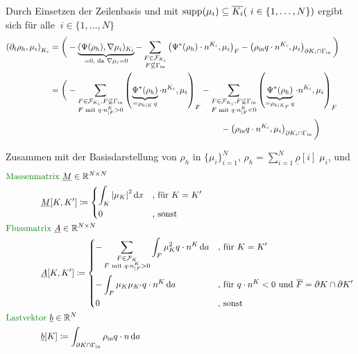 Durch Einsetzen der Zeilenbasis und mit $ \operatorname{supp}(\mu_i) \subseteq \overline{K_i} (\ i \in \{1, \dots , N\})$ ergibt sich für alle $\ i \in \{1, \dots , N\}$ 
\begin{align*}
	\left(\partial_t \rho_h, \mu_i  \right)_{K_i}  &= \bigg( -\underbrace{(\Psi(\rho_h), \nabla\mu_i)_{K_i}}_{=0 \text{, da } \nabla \mu_i = 0} - \sum_{\substack{F \in \mathcal{F}_{K_i} \\ F \not\subseteq \Gamma_{{\text{in}}}}} \left(\Psi^*(\rho_h) \cdot n^{K_i}, \mu_i \right)_{F} - \left(\rho_{\text{in}} q \cdot n^{K_i}, \mu_i \right)_{\partial K_i \cap \Gamma_{{\text{in}}}} \bigg) \\
	&= \bigg( - \sum_{\substack{F \in \mathcal{F}_{K_i}, F \not\subseteq \Gamma_{{\text{in}}}\\ F \text{ mit }q \cdot n^K_{|F} > 0} } \left(\underbrace{\Psi^*(\rho_h)}_{= \rho_{h|K}\, q} \cdot n^{K_i}, \mu_i \right)_{F} - \sum_{\substack{F \in \mathcal{F}_{K_i}, F \not\subseteq \Gamma_{{\text{in}}}\\ F \text{ mit }q \cdot n^K_{|F} < 0} } \left(\underbrace{\Psi^*(\rho_h)}_{= \rho_{h|K_F} \, q} \cdot n^{K_i}, \mu_i \right)_{F}\\
	& \qquad \qquad \qquad \qquad \qquad \qquad  \qquad \qquad\qquad \qquad- \left(\rho_{\text{in}} q \cdot n^{K_i}, \mu_i \right)_{\partial K_i \cap \Gamma_{{\text{in}}}} \bigg)\qquad \qquad
\end{align*} 

Zusammen mit der Basisdarstellung von $ \rho_h $ in $\{\mu_i  \}_{i=1}^N$, $ \rho_h = \sum_{i=1}^{N} \underline{\rho}[i] \; \mu_i$, und 
\begin{align*}
&\text{\defi{Massenmatrix} } \underline{M}\in \R^{N \times N} \\  &\qquad \qquad \underline{M}[K,K'] \coloneqq \begin{dcases}
\int_K \abs{\mu_K}^2 \diff x & \text{, für } K = K' \\
0 &\text{, sonst}
\end{dcases} \\
&\text{\defi{Flussmatrix} } \underline{A}\in \R^{N \times N} \\ &\qquad \qquad \underline{A}[K,K'] \coloneqq \begin{dcases}
- \sum_{\substack{F\in \mathcal{F}_K \\ F \text{ mit } q\cdot n^K_{|F} > 0}} \int_F \mu_K^2 q \cdot n^K \diff a& \text{, für } K = K' \\
- \int_F \mu_K \mu_{K'} q \cdot n^K \diff a &\text{, für } q \cdot n^K< 0 \text{ und } \overline{F} = \partial K \cap \partial K'\\
0 &\text{, sonst}
\end{dcases} \\
&\text{\defi{Lastvektor} } \underline{b}\in \R^{N} \\ &\qquad \qquad\underline{b}[K] \coloneqq \int_{\partial K \cap \Gammain} \rhoin q \cdot n \diff a
\end{align*}


